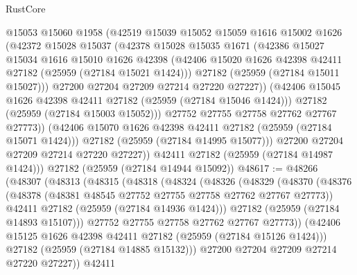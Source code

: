 \begin{lexlean}{RustCore}
\begin{coremodule}
                @15053
                @15060
                @1958
                (@42519
                  @15039
                  @15052
                  @15059
                  @1616
                  @15002
                  @1626
                  (@42372
                    @15028
                    @15037
                    (@42378
                      @15028
                      @15035
                      @1671
                      (@42386
                        @15027
                        @15034
                        @1616
                        @15010
                        @1626
                        @42398
                        (@42406 @15020 @1626 @42398 @42411 @27182 (@25959 (@27184 @15021 @1424)))
                        @27182
                        (@25959 (@27184 @15011 @15027)))
                      @27200
                      @27204
                      @27209
                      @27214
                      @27220
                      @27227))
                  (@42406 @15045 @1626 @42398 @42411 @27182 (@25959 (@27184 @15046 @1424)))
                  @27182
                  (@25959 (@27184 @15003 @15052)))
                @27752
                @27755
                @27758
                @27762
                @27767
                @27773))
            (@42406 @15070 @1626 @42398 @42411 @27182 (@25959 (@27184 @15071 @1424)))
            @27182
            (@25959 (@27184 @14995 @15077)))
          @27200
          @27204
          @27209
          @27214
          @27220
          @27227))
      @42411
      @27182
      (@25959 (@27184 @14987 @1424)))
    @27182
    (@25959 (@27184 @14944 @15092))
@48617 := @48266
    (@48307
      (@48313
        (@48315
          (@48318
            (@48324
              (@48326
                (@48329
                  (@48370
                    (@48376
                      (@48378 (@48381 @48545 @27752 @27755 @27758 @27762 @27767 @27773))
                      @42411
                      @27182
                      (@25959 (@27184 @14936 @1424)))
                    @27182
                    (@25959 (@27184 @14893 @15107)))
                  @27752
                  @27755
                  @27758
                  @27762
                  @27767
                  @27773))
              (@42406 @15125 @1626 @42398 @42411 @27182 (@25959 (@27184 @15126 @1424)))
              @27182
              (@25959 (@27184 @14885 @15132)))
            @27200
            @27204
            @27209
            @27214
            @27220
            @27227))
        @42411

\end{coremodule}
\end{lexlean}
